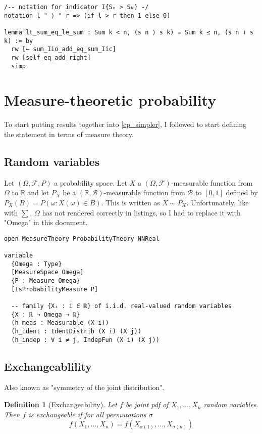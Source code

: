 \documentclass[a4paper, 12pt]{article}
\newtheorem{definition}{Definition}
\newcommand{\R}{\mathbb{R}}
\begin{document}
\begin{lstlisting}
/-- notation for indicator I{Sₙ > Sₖ} -/
notation l " ⟩ " r => (if l > r then 1 else 0)

lemma lt_sum_eq_le_sum : Sum k < n, (s n ⟩ s k) = Sum k ≤ n, (s n ⟩ s k) := by
  rw [← sum_Iio_add_eq_sum_Iic]
  rw [self_eq_add_right]
  simp
\end{lstlisting}

\section*{Measure-theoretic probability}

To start putting results together into \ref{cp_simpler},
I followed \cite{degenne_mathlib_prob_2024} to
start defining the statement in terms of measure theory.

\subsection*{Random variables}

Let $(\Omega, \mathcal{F}, P)$ a probability space.
Let $X$ a $(\Omega, \mathcal{F})$-measurable function from $\Omega$ to $\R$
and let $P_X$ be a $(\R, \mathcal{B})$-measurable function from $\mathcal{B}$ to $[0,1]$
defined by $P_X(B)=P(\omega\colon X(\omega)\in B)$. This is written as $X \sim P_X$.
Unfortunately, like with $\sum$,
$\Omega$ has not rendered correctly in listings,
so I had to replace it with "Omega" in this document.

\begin{lstlisting}
open MeasureTheory ProbabilityTheory NNReal

variable
  {Omega : Type}
  [MeasureSpace Omega]
  {P : Measure Omega}
  [IsProbabilityMeasure P]

  -- family {Xᵢ : i ∈ ℝ} of i.i.d. real-valued random variables
  {X : ℝ → Omega → ℝ}
  (h_meas : Measurable (X i))
  (h_ident : IdentDistrib (X i) (X j))
  (h_indep : ∀ i ≠ j, IndepFun (X i) (X j))
\end{lstlisting}

\subsection*{Exchangeablility}

Also known as "symmetry of the joint distribution".

\begin{definition}[Exchangeability]
  \label{exch}
  Let $f$ be joint pdf of $X_1, \ldots, X_n$ random variables.
  Then $f$ is exchangeable if for all permutations $\sigma$
  $$f(X_1, \ldots, X_n)=f(X_{\sigma(1)}, \ldots, X_{\sigma(n)})$$
\end{definition}
\end{document}
